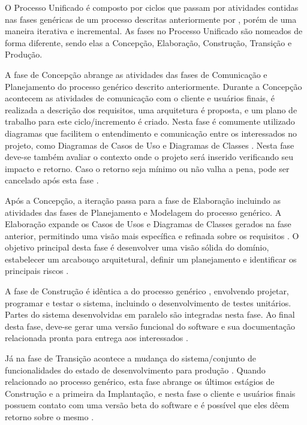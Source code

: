 O Processo Unificado é composto por ciclos que passam por atividades contidas nas fases genéricas de um processo descritas anteriormente por , porém de uma maneira iterativa e incremental. As fases no Processo Unificado são nomeados de forma diferente, sendo elas a Concepção, Elaboração, Construção, Transição e Produção.

A fase de Concepção abrange as atividades das fases de Comunicação e Planejamento do processo genérico descrito anteriormente. Durante a Concepção acontecem as atividades de comunicação com o cliente e usuários finais, é realizada a descrição dos requisitos, uma arquitetura é proposta, e um plano de trabalho para este ciclo/incremento é criado. Nesta fase é comumente utilizado diagramas que facilitem o entendimento e comunicação entre os interessados no projeto, como Diagramas de Casos de Uso e Diagramas de Classes \cite{pressman06}. Nesta fase deve-se também avaliar o contexto onde o projeto será inserido verificando seu impacto e retorno. Caso o retorno seja mínimo ou não valha a pena, pode ser cancelado após esta fase \cite{sommerville10}.

Após a Concepção, a iteração passa para a fase de Elaboração incluindo as atividades das fases de Planejamento e Modelagem do processo genérico. A Elaboração expande os Casos de Usos e Diagramas de Classes gerados na fase anterior, permitindo uma visão mais específica e refinada sobre os requisitos \cite{pressman06}. O objetivo principal desta fase é desenvolver uma visão sólida do domínio, estabelecer um arcabouço arquitetural, definir um planejamento e identificar os principais riscos \cite{sommerville10}.

A fase de Construção é idêntica a do processo genérico \cite{pressman06}, envolvendo projetar, programar e testar o sistema, incluindo o desenvolvimento de testes unitários. Partes do sistema desenvolvidas em paralelo são integradas nesta fase. Ao final desta fase, deve-se gerar uma versão funcional do software e sua documentação relacionada pronta para entrega aos interessados \cite{sommerville10}. 

Já na fase de Transição acontece a mudança do sistema/conjunto de funcionalidades do estado de desenvolvimento para produção \cite{sommerville10}. Quando relacionado ao processo genérico, esta fase abrange os últimos estágios de Construção e a primeira da Implantação, e nesta fase o cliente e usuários finais possuem contato com uma versão beta do software e é possível que eles dêem retorno sobre o mesmo  \cite{pressman06}.

